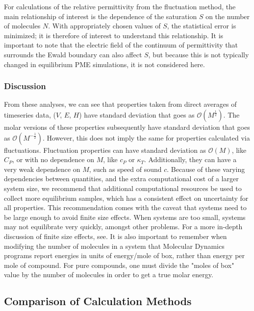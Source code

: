 \documentclass[9pt,bestpractices]{livecoms}
\begin{document}
For calculations of the relative permittivity from the fluctuation method, the main relationship of interest is the dependence of the saturation $S$ on the number of molecules $N$.  With appropriately chosen values of $S$, the statistical error is minimized; it is therefore of interest to understand this relationship.  It is important to note that the electric field of the continuum of permittivity that surrounds the Ewald boundary can also affect $S$, but because this is not typically changed in equilibrium PME simulations, it is not considered here.  


\subsubsection{Discussion}
From these analyses, we can see that properties taken from direct averages of timeseries data, ($V$, $E$, $H$) have standard deviation that goes as $\mathcal{O}(M^{\frac{1}{2}})$.  The molar versions of these properties subsequently have standard deviation that goes as $\mathcal{O}(M^{-\frac{1}{2}})$.  However, this does not imply the same for properties calculated via fluctuations.  Fluctuation properties can have standard deviation as $\mathcal{O}(M)$, like $C_P$, or with no dependence on $M$, like $c_P$ or $\kappa_T$.  Additionally, they can have a very weak dependence on $M$, such as speed of sound $c$.  Because of these varying dependencies between quantities, and the extra computational cost of a larger system size, we recommend that additional computational resources be used to collect more equilibrium samples, which has a consistent effect on uncertainty for all properties.  This recommendation comes with the caveat that systems need to be large enough to avoid finite size effects.  When systems are too small, systems may not equilibrate very quickly, amongst other problems.  For a more in-depth discussion of finite size effects, see. %
It is also important to remember when modifying the number of molecules in a system that Molecular Dynamics programs report energies in units of energy/mole of box, rather than energy per mole of compound.  For pure compounds, one must divide the "moles of box" value by the number of molecules in order to get a true molar energy.



\subsection{Comparison of Calculation Methods}
\end{document}
